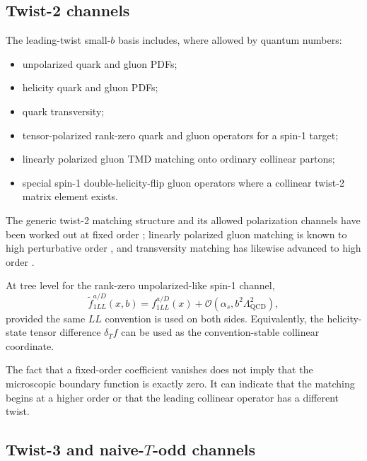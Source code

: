 \documentclass[11pt]{article}
\newcommand{\QCD}{\mathrm{QCD}}
\newcommand{\cO}{\mathcal O}
\begin{document}
\subsection{Twist-2 channels}

The leading-twist small-\(b\) basis includes, where allowed by quantum
numbers:
\begin{itemize}
\item unpolarized quark and gluon PDFs;
\item helicity quark and gluon PDFs;
\item quark transversity;
\item tensor-polarized rank-zero quark and gluon operators for a spin-1
      target;
\item linearly polarized gluon TMD matching onto ordinary collinear partons;
\item special spin-1 double-helicity-flip gluon operators where a collinear
      twist-2 matrix element exists.
\end{itemize}
The generic twist-2 matching structure and its allowed polarization channels
have been worked out at fixed order \cite{GutierrezReyes2017}; linearly
polarized gluon matching is known to high perturbative order
\cite{GutierrezReyes2019,LuoYangZhuZhu2019,ZhuLinearlyPolarized2025}, and
transversity matching has likewise advanced to high order
\cite{ZhuTransversity2025,ZhuDGLAP2026}.

At tree level for the rank-zero unpolarized-like spin-1 channel,
\begin{equation}
 \widetilde f_{1LL}^{a/D}(x,b)
 =f_{1LL}^{a/D}(x)+\cO(\alpha_s,b^2\Lambda_{\QCD}^2),
 \label{eq:f1ll-tree-matching}
\end{equation}
provided the same \(LL\) convention is used on both sides.  Equivalently, the
helicity-state tensor difference \(\delta_T f\) can be used as the
convention-stable collinear coordinate.

The fact that a fixed-order coefficient vanishes does not imply that the
microscopic boundary function is exactly zero.  It can indicate that the
matching begins at a higher order or that the leading collinear operator has a
different twist.

\subsection{Twist-3 and naive-\texorpdfstring{\(T\)-odd}{T-odd} channels}
\end{document}
